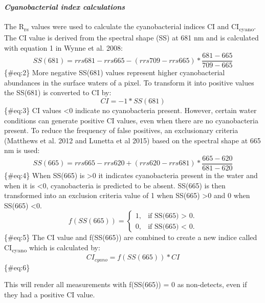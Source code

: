 \documentclass[]{article}
\let\oldparagraph\paragraph
\renewcommand{\paragraph}[1]{\oldparagraph{#1}\mbox{}}
\begin{document}
\paragraph{\texorpdfstring{\emph{Cyanobacterial index
calculations}}{Cyanobacterial index calculations}}\label{cyanobacterial-index-calculations}

The R\textsubscript{rs} values were used to calculate the cyanobacterial
indices CI and CI\textsubscript{cyano}. The CI value is derived from the
spectral shape (SS) at 681 nm and is calculated with equation 1 in Wynne
et al. 2008: \[
\begin{equation}
SS(681) = rrs681 - rrs665 - (rrs709 - rrs665) * \frac{681-665}{709-665}
\end{equation}
\] \{\#eq:2\} More negative SS(681) values represent higher
cyanobacterial abundances in the surface waters of a pixel. To transform
it into positive values the SS(681) is converted to CI by: \[
\begin{equation}
CI = -1*SS(681)
\end{equation}
\] \{\#eq:3\} CI values \textless{}0 indicate no cyanobacteria present.
However, certain water conditions can generate positive CI values, even
when there are no cyanobacteria present. To reduce the frequency of
false positives, an exclusionary criteria (Matthews et al. 2012 and
Lunetta et al 2015) based on the spectral shape at 665 nm is used: \[
\begin{equation}
SS(665) = rrs665 - rrs620 + (rrs620 - rrs681) * \frac{665-620}{681-620}
\end{equation}
\] \{\#eq:4\} When SS(665) is \textgreater{}0 it indicates cyanobacteria
present in the water and when it is \textless{}0, cyanobacteria is
predicted to be absent. SS(665) is then transformed into an exclusion
criteria value of 1 when SS(665) \textgreater{}0 and 0 when SS(665)
\textless{}0. \[
\begin{equation}
  f(SS(665))=\begin{cases}
    1, & \text{if SS(665) > 0}.\\  
    0, & \text{if SS(665) < 0}.
  \end{cases}
\end{equation}
\] \{\#eq:5\} The CI value and f(SS(665)) are combined to create a new
indice called CI\textsubscript{cyano} which is calculated by: \[
\begin{equation}
CI_{cyano} = f(SS(665)) * CI
\end{equation}
\] \{\#eq:6\}

This will render all measurements with f(SS(665)) = 0 as non-detects,
even if they had a positive CI value.
\end{document}
